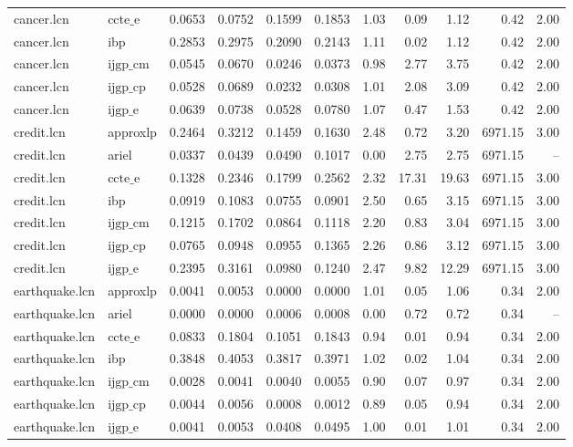 \begin{table}[ht]
\begin{tabular}{llrrrrrrrrr}
cancer.lcn & $\text{ccte\_e}$ & 0.0653 & 0.0752 & 0.1599 & 0.1853 & 1.03 & 0.09 & 1.12 & 0.42 & 2.00 \\
cancer.lcn & ibp & 0.2853 & 0.2975 & 0.2090 & 0.2143 & 1.11 & 0.02 & 1.12 & 0.42 & 2.00 \\
cancer.lcn & $\text{ijgp\_cm}$ & 0.0545 & 0.0670 & 0.0246 & 0.0373 & 0.98 & 2.77 & 3.75 & 0.42 & 2.00 \\
cancer.lcn & $\text{ijgp\_cp}$ & 0.0528 & 0.0689 & 0.0232 & 0.0308 & 1.01 & 2.08 & 3.09 & 0.42 & 2.00 \\
cancer.lcn & $\text{ijgp\_e}$ & 0.0639 & 0.0738 & 0.0528 & 0.0780 & 1.07 & 0.47 & 1.53 & 0.42 & 2.00 \\
credit.lcn & approxlp & 0.2464 & 0.3212 & 0.1459 & 0.1630 & 2.48 & 0.72 & 3.20 & 6971.15 & 3.00 \\
credit.lcn & ariel & 0.0337 & 0.0439 & 0.0490 & 0.1017 & 0.00 & 2.75 & 2.75 & 6971.15 & -- \\
credit.lcn & $\text{ccte\_e}$ & 0.1328 & 0.2346 & 0.1799 & 0.2562 & 2.32 & 17.31 & 19.63 & 6971.15 & 3.00 \\
credit.lcn & ibp & 0.0919 & 0.1083 & 0.0755 & 0.0901 & 2.50 & 0.65 & 3.15 & 6971.15 & 3.00 \\
credit.lcn & $\text{ijgp\_cm}$ & 0.1215 & 0.1702 & 0.0864 & 0.1118 & 2.20 & 0.83 & 3.04 & 6971.15 & 3.00 \\
credit.lcn & $\text{ijgp\_cp}$ & 0.0765 & 0.0948 & 0.0955 & 0.1365 & 2.26 & 0.86 & 3.12 & 6971.15 & 3.00 \\
credit.lcn & $\text{ijgp\_e}$ & 0.2395 & 0.3161 & 0.0980 & 0.1240 & 2.47 & 9.82 & 12.29 & 6971.15 & 3.00 \\
earthquake.lcn & approxlp & 0.0041 & 0.0053 & 0.0000 & 0.0000 & 1.01 & 0.05 & 1.06 & 0.34 & 2.00 \\
earthquake.lcn & ariel & 0.0000 & 0.0000 & 0.0006 & 0.0008 & 0.00 & 0.72 & 0.72 & 0.34 & -- \\
earthquake.lcn & $\text{ccte\_e}$ & 0.0833 & 0.1804 & 0.1051 & 0.1843 & 0.94 & 0.01 & 0.94 & 0.34 & 2.00 \\
earthquake.lcn & ibp & 0.3848 & 0.4053 & 0.3817 & 0.3971 & 1.02 & 0.02 & 1.04 & 0.34 & 2.00 \\
earthquake.lcn & $\text{ijgp\_cm}$ & 0.0028 & 0.0041 & 0.0040 & 0.0055 & 0.90 & 0.07 & 0.97 & 0.34 & 2.00 \\
earthquake.lcn & $\text{ijgp\_cp}$ & 0.0044 & 0.0056 & 0.0008 & 0.0012 & 0.89 & 0.05 & 0.94 & 0.34 & 2.00 \\
earthquake.lcn & $\text{ijgp\_e}$ & 0.0041 & 0.0053 & 0.0408 & 0.0495 & 1.00 & 0.01 & 1.01 & 0.34 & 2.00 \\

\end{tabular}
\end{table}
